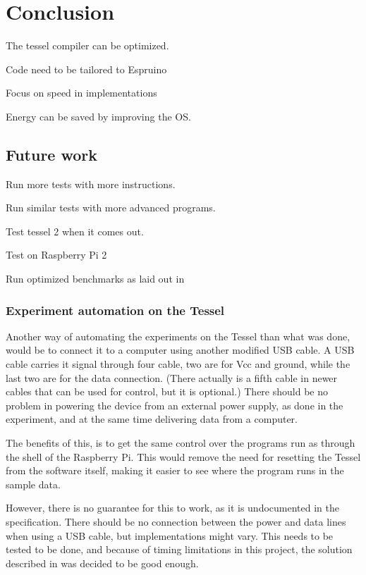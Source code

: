 \chapter{Conclusion}
\label{chap:chapter6}

The tessel compiler can be optimized.

Code need to be tailored to Espruino

Focus on speed in implementations

Energy can be saved by improving the OS.

\section{Future work}
Run more tests with more instructions.

Run similar tests with more advanced programs.

Test tessel 2 when it comes out.

Test on Raspberry Pi 2

Run optimized benchmarks as laid out in 

\subsection{Experiment automation on the Tessel}
Another way of automating the experiments on the Tessel than what was done, would be to connect it to a computer using another modified USB cable.
A USB cable carries it signal through four cable, two are for Vcc and ground, while the last two are for the data connection.
(There actually is a fifth cable in newer cables that can be used for control, but it is optional.)
There should be no problem in powering the device from an external power supply, as done in the experiment, and at the same time delivering data from a computer.

The benefits of this, is to get the same control over the programs run as through the shell of the Raspberry Pi.
This would remove the need for resetting the Tessel from the software itself, making it easier to see where the program runs in the sample data.

However, there is no guarantee for this to work, as it is undocumented in the specification.
There should be no connection between the power and data lines when using a USB cable, but implementations might vary.
This needs to be tested to be done, and because of timing limitations in this project, the solution described in  was decided to be good enough.

